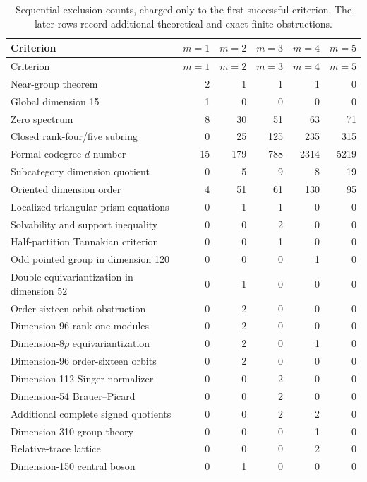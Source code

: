 {\small
\begin{longtable}{@{}l r r r r r @{}}
\caption{Sequential exclusion counts, charged only to the first successful criterion. The later rows record additional theoretical and exact finite obstructions.}\label{tab:stages}\\
\toprule
Criterion & $m=1$ & $m=2$ & $m=3$ & $m=4$ & $m=5$\\
\midrule
\endfirsthead
\toprule
Criterion & $m=1$ & $m=2$ & $m=3$ & $m=4$ & $m=5$\\
\midrule
\endhead
\bottomrule
\endfoot
Near-group theorem & 2 & 1 & 1 & 1 & 0\\
Global dimension 15 & 1 & 0 & 0 & 0 & 0\\
Zero spectrum & 8 & 30 & 51 & 63 & 71\\
Closed rank-four/five subring & 0 & 25 & 125 & 235 & 315\\
Formal-codegree $d$-number & 15 & 179 & 788 & 2314 & 5219\\
Subcategory dimension quotient & 0 & 5 & 9 & 8 & 19\\
Oriented dimension order & 4 & 51 & 61 & 130 & 95\\
Localized triangular-prism equations & 0 & 1 & 1 & 0 & 0\\
Solvability and support inequality & 0 & 0 & 2 & 0 & 0\\
Half-partition Tannakian criterion & 0 & 0 & 1 & 0 & 0\\
Odd pointed group in dimension 120 & 0 & 0 & 0 & 1 & 0\\
Double equivariantization in dimension 52 & 0 & 1 & 0 & 0 & 0\\
Order-sixteen orbit obstruction & 0 & 2 & 0 & 0 & 0\\
Dimension-96 rank-one modules & 0 & 2 & 0 & 0 & 0\\
Dimension-$8p$ equivariantization & 0 & 2 & 0 & 1 & 0\\
Dimension-96 order-sixteen orbits & 0 & 2 & 0 & 0 & 0\\
Dimension-112 Singer normalizer & 0 & 0 & 2 & 0 & 0\\
Dimension-54 Brauer--Picard & 0 & 0 & 2 & 0 & 0\\
Additional complete signed quotients & 0 & 0 & 2 & 2 & 0\\
Dimension-310 group theory & 0 & 0 & 0 & 1 & 0\\
Relative-trace lattice & 0 & 0 & 0 & 2 & 0\\
Dimension-150 central boson & 0 & 1 & 0 & 0 & 0\\

\end{longtable}}
